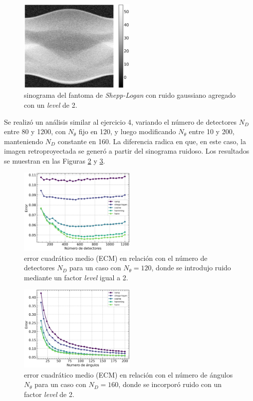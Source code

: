 \documentclass[11pt, twocolumn]{article}
\begin{document}
\begin{figure} [htbp]
    \centering
    \includegraphics[width=0.5\textwidth]{images/ej_5/sinogram_noisy.png}
    \caption{sinograma del fantoma de \textit{Shepp-Logan} con ruido gaussiano agregado con un \textit{level} de 2.}
    \label{fig:sinograma_ruido}
\end{figure}

Se realizó un análisis similar al ejercicio 4, variando el número de detectores $N_D$ entre 80 y 1200, con $N_\theta$ fijo en 120, y luego modificando $N_\theta$ entre 10 y 200, manteniendo $N_D$ constante en 160. La diferencia radica en que, en este caso, la imagen retroproyectada se generó a partir del sinograma ruidoso. Los resultados se muestran en las Figuras \ref{fig:error_escalas_ruido} y \ref{fig:error_angulos_ruido}.

\begin{figure} [htbp]
    \centering
    \includegraphics*[width=0.5\textwidth]{./images/ej_5/scale_error_noisy.png}
    \caption{error cuadrático medio (ECM) en relación con el número de detectores $N_D$ para un caso con $N_\theta = 120$, donde se introdujo ruido mediante un factor \textit{level} igual a 2.}
    \label{fig:error_escalas_ruido}
\end{figure}

\begin{figure} [htbp]
    \centering
    \includegraphics*[width=0.5\textwidth]{./images/ej_5/angle_error_noisy.png}
    \caption{error cuadrático medio (ECM) en relación con el número de ángulos $N_\theta$ para un caso con $N_D = 160$, donde se incorporó ruido con un factor \textit{level} de 2.}
    \label{fig:error_angulos_ruido}
\end{figure}
\end{document}
